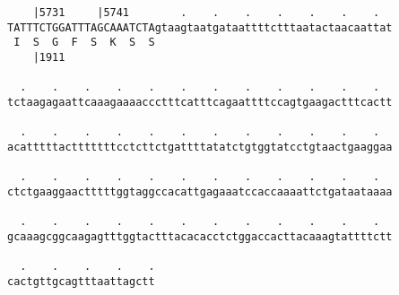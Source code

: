 \documentclass{article}
\begin{document}
\begin{Verbatim}
    |5731     |5741        .    .    .    .    .    .    .  
TATTTCTGGATTTAGCAAATCTAgtaagtaatgataattttctttaatactaacaattat
 I  S  G  F  S  K  S  S                                     
    |1911                                                   
  
  .    .    .    .    .    .    .    .    .    .    .    .  
tctaagagaattcaaagaaaaccctttcatttcagaattttccagtgaagactttcactt
  
  .    .    .    .    .    .    .    .    .    .    .    .  
acatttttactttttttcctcttctgattttatatctgtggtatcctgtaactgaaggaa
  
  .    .    .    .    .    .    .    .    .    .    .    .  
ctctgaaggaactttttggtaggccacattgagaaatccaccaaaattctgataataaaa
  
  .    .    .    .    .    .    .    .    .    .    .    .  
gcaaagcggcaagagtttggtactttacacacctctggaccacttacaaagtattttctt
  
  .    .    .    .    .
cactgttgcagtttaattagctt
\end{Verbatim}
\newpage
\end{document}
